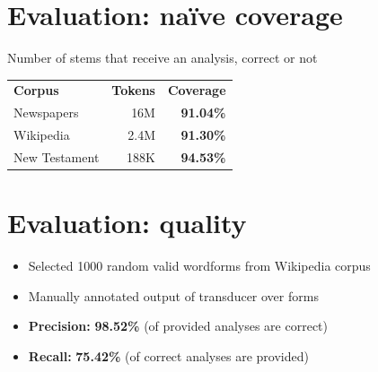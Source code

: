\documentclass[a0paper,fleqn]{betterposter}
\begin{document}
{%


\section{Evaluation: naïve coverage}

\vspace{-2em}
Number of stems that receive an analysis, correct or not\\
\vspace{-1em}

\noindent\begin{tabular}{ l r r }
 \textbf{Corpus} & \textbf{Tokens} & \textbf{Coverage} \\ 
 Newspapers & 16M & \textbf{\color{lightgreen}91.04\%}  \\
 Wikipedia & 2.4M & \textbf{\color{lightgreen}91.30\%} \\
 New Testament & 188K & \textbf{\color{lightgreen}94.53\%} \\
\end{tabular}

\section{Evaluation: quality}

\vspace{-2em}
\begin{itemize}
\item Selected 1000 random valid wordforms from Wikipedia corpus
\item Manually annotated output of transducer over forms
\item \textbf{Precision:} {\color{lightgreen}\textbf{98.52\%}} (of provided analyses are correct)
\item \textbf{Recall:} {\color{orange}\textbf{75.42\%}} (of correct analyses are provided)
\end{itemize}
\vspace{-0.5em}


}
\end{document}
